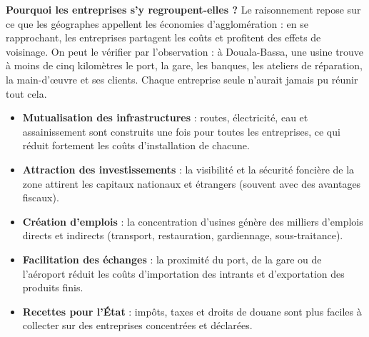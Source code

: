 \documentclass[11pt]{article}
\newcommand{\cle}[1]{{\popxbold\color{popdark}#1}}
\begin{document}
\textbf{Pourquoi les entreprises s'y regroupent-elles ?} Le raisonnement repose sur ce que les géographes appellent les \cle{économies d'agglomération} : en se rapprochant, les entreprises partagent les coûts et profitent des effets de voisinage. On peut le vérifier par l'observation : à Douala-Bassa, une usine trouve à moins de cinq kilomètres le port, la gare, les banques, les ateliers de réparation, la main-d'œuvre et ses clients. Chaque entreprise seule n'aurait jamais pu réunir tout cela.

\begin{propriete}
\begin{itemize}
\item \textbf{Mutualisation des infrastructures} : routes, électricité, eau et assainissement sont construits une fois pour toutes les entreprises, ce qui réduit fortement les coûts d'installation de chacune.
\item \textbf{Attraction des investissements} : la visibilité et la sécurité foncière de la zone attirent les capitaux nationaux et étrangers (souvent avec des avantages fiscaux).
\item \textbf{Création d'emplois} : la concentration d'usines génère des milliers d'emplois directs et indirects (transport, restauration, gardiennage, sous-traitance).
\item \textbf{Facilitation des échanges} : la proximité du port, de la gare ou de l'aéroport réduit les coûts d'importation des intrants et d'exportation des produits finis.
\item \textbf{Recettes pour l'État} : impôts, taxes et droits de douane sont plus faciles à collecter sur des entreprises concentrées et déclarées.
\end{itemize}
\end{propriete}
\end{document}
